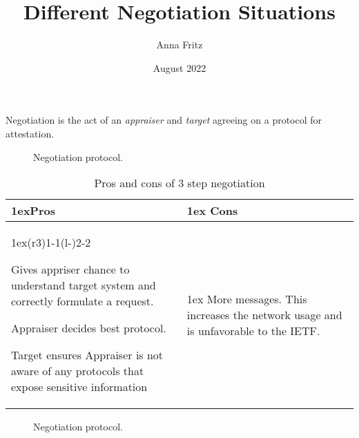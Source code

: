 \documentclass[12pt]{article}
\title{Different Negotiation Situations}
\author{Anna Fritz}
\date{August 2022}
\begin{document}
\begin{titlepage}
\maketitle
\end{titlepage}

Negotiation is the act of an \emph{appraiser} and \emph{target} agreeing on a protocol for attestation. 

\begin{figure}[hbtp]
    \centering 
    
    \caption[Negotiation process]{Negotiation protocol.}
    \label{fig:negotiation-fig}
  \end{figure}

\begin{table}
    \begin{tabularx}{\linewidth}{>{\parskip1ex}X@{\kern4\tabcolsep}>{\parskip1ex}X}
        \toprule
        \hfil\bfseries Pros
        &
        \hfil\bfseries Cons
        \\\cmidrule(r{3\tabcolsep}){1-1}\cmidrule(l{-\tabcolsep}){2-2}

        Gives appriser chance to understand target system and correctly formulate a request. \par
        Appraiser decides best protocol. \par
        Target ensures Appraiser is not aware of any protocols that expose sensitive information \par        
        &
        More messages. This increases the network usage and is unfavorable to the IETF. \par 

        \\\bottomrule
    \end{tabularx}
    \caption{Pros and cons of 3 step negotiation}
\end{table}

\begin{figure}[hbtp]
    \centering 
    
    \caption[Negotiation process]{Negotiation protocol.}
    \label{fig:negotiation-fig-2}
\end{figure}
\end{document}

